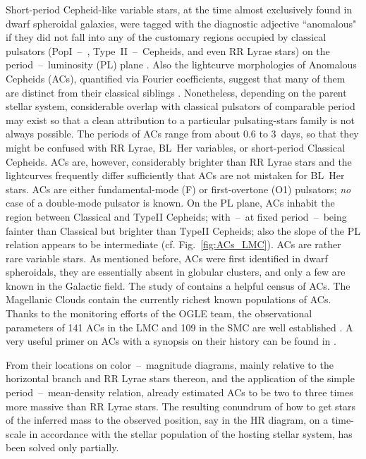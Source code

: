 \documentclass[a4paper,fleqn,usenatbib]{mnras}
\begin{document}
Short-period Cepheid-like variable stars, at the time almost
exclusively found in dwarf spheroidal galaxies, were tagged with the
diagnostic adjective ``anomalous" if they did not fall into any of the
customary regions occupied by classical pulsators (PopI~--~,
Type~II~--~Cepheids, and even RR Lyrae stars) on the
period~--~luminosity (PL) plane \citep{Zinn1976}. Also the lightcurve
morphologies of Anomalous Cepheids (ACs), quantified via Fourier
coefficients, suggest that many of them are distinct from their
classical siblings \citep[e.g.][on the Magellanic
Clouds]{Soszynski2015}.  Nonetheless, depending on the parent stellar
system, considerable overlap with classical pulsators of comparable
period may exist so that a clean attribution to a particular
pulsating-stars family is not always possible.  The periods of ACs
range from about 0.6 to 3~days, so that they might be confused with RR
Lyrae, BL~Her variables, or short-period Classical Cepheids.  ACs are,
however, considerably brighter than RR Lyrae stars and the lightcurves
frequently differ sufficiently that ACs are not mistaken for BL~Her
stars. ACs are either fundamental-mode (F) or first-overtone (O1)
pulsators; \emph{no} case of a double-mode pulsator is known. On the
PL plane, ACs inhabit the region between Classical and TypeII
Cepheids; with~--~at fixed period~--~being fainter than Classical but
brighter than TypeII Cepheids; also the slope of the PL relation
appears to be intermediate (cf. Fig.~\ref{fig:ACs_LMC}).  ACs are
rather rare variable stars. As mentioned before, ACs were first
identified in dwarf spheroidals, they are essentially absent in
globular clusters, and only a few are known in the Galactic field.
The study of \citet{Fiorentino2012} contains a helpful census of ACs.
The Magellanic Clouds contain the currently richest known populations
of ACs. Thanks to the monitoring efforts of the OGLE team, the
observational parameters of 141 ACs in the LMC and 109 in the SMC are
well established \citep{Soszynski2015}.  A very useful primer on ACs
with a synopsis on their history can be found in \citet{Catelan2015}.

From their locations on color~--~magnitude diagrams, mainly relative
to the horizontal branch and RR Lyrae stars thereon, and the
application of the simple period~--~mean-density relation, already
\citet{Zinn1976} estimated ACs to be two to three times more massive
than RR Lyrae stars.  The resulting conundrum of how to get stars of
the inferred mass to the observed position, say in the HR diagram, on
a time-scale in accordance with the stellar population of the hosting
stellar system, has been solved only partially.
\end{document}

